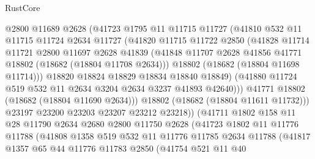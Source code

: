 \begin{lexlean}{RustCore}
\begin{coremodule}
                    @2800
                    @11689
                    @2628
                    (@41723
                      @1795
                      @11
                      @11715
                      @11727
                      (@41810
                        @532
                        @11
                        @11715
                        @11724
                        @2634
                        @11727
                        (@41820
                          @11715
                          @11722
                          @2850
                          (@41828
                            @11714
                            @11721
                            @2800
                            @11697
                            @2628
                            @41839
                            (@41848
                              @11707
                              @2628
                              @41856
                              @41771
                              @18802
                              (@18682 (@18804 @11708 @2634)))
                            @18802
                            (@18682 (@18804 @11698 @11714)))
                          @18820
                          @18824
                          @18829
                          @18834
                          @18840
                          @18849)
                        (@41880 @11724 @519 @532 @11 @2634 @3204 @2634 @3237 @41893 @42640)))
                    @41771
                    @18802
                    (@18682 (@18804 @11690 @2634)))
                  @18802
                  (@18682 (@18804 @11611 @11732)))
                @23197
                @23200
                @23203
                @23207
                @23212
                @23218))
            (@41711
              @1802
              @158
              @11
              @28
              @11790
              @2634
              @2680
              @2800
              @11750
              @2628
              (@41723
                @1802
                @11
                @11776
                @11788
                (@41808
                  @1358
                  @519
                  @532
                  @11
                  @11776
                  @11785
                  @2634
                  @11788
                  (@41817
                    @1357
                    @65
                    @44
                    @11776
                    @11783
                    @2850
                    (@41754
                      @521
                      @11
                      @40

\end{coremodule}
\end{lexlean}
